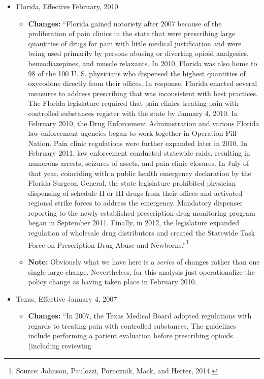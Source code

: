 \documentclass[12pt]{article}
\begin{document}
\begin{itemize}

\item Florida, Effective February, 2010
\begin{itemize}
  \item \textbf{Changes:} ``Florida gained notoriety after 2007 because of the proliferation of pain clinics in the state that were prescribing large quantities of drugs for pain with little medical justification and were being used primarily by persons abusing or diverting opioid analgesics, benzodiazepines, and muscle relaxants. In 2010, Florida was also home to 98 of the 100 U. S. physicians who dispensed the highest quantities of oxycodone directly from their offices. In response, Florida enacted several measures to address prescribing that was inconsistent with best practices. The Florida legislature required that pain clinics treating pain with controlled substances register with the state by January 4, 2010. In February 2010, the Drug Enforcement Administration and various Florida law enforcement agencies began to work together in Operation Pill Nation. Pain clinic regulations were further expanded later in 2010. In February 2011, law enforcement conducted statewide raids, resulting in numerous arrests, seizures of assets, and pain clinic closures. In July of that year, coinciding with a public health emergency declaration by the Florida Surgeon General, the state legislature prohibited physician dispensing of schedule II or III drugs from their offices and activated regional strike forces to address the emergency. Mandatory dispenser reporting to the newly established prescription drug monitoring program began in September 2011. Finally, in 2012, the legislature expanded regulation of wholesale drug distributors and created the Statewide Task Force on Prescription Drug Abuse and Newborns.''\footnote{Source: Johnson, Paulozzi, Porucznik, Mack, and Herter, 2014.}
  \item \textbf{Note:} Obviously what we have here is a \emph{series} of changes rather than one single large change. Nevertheless, for this analysis just operationalize the policy change as having taken place in February 2010.
\end{itemize}
  \item Texas, Effective January 4, 2007
  \begin{itemize}
    \item \textbf{Changes:} ``In 2007, the Texas Medical Board adopted regulations with regards to treating pain with
controlled substances. The guidelines include performing a patient evaluation before prescribing opioids (including reviewing

\end{itemize}
\end{itemize}
\end{document}
